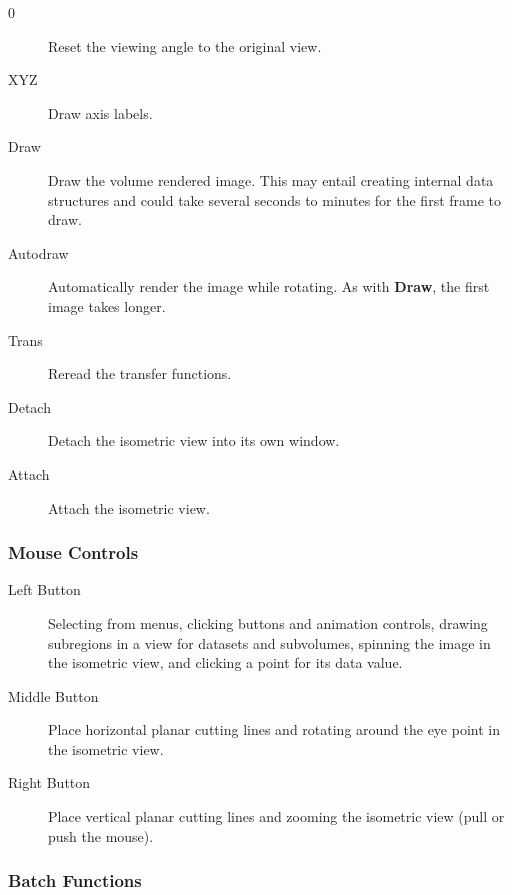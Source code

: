 \begin{description}
\begin{description}
    \item [0]              Reset the viewing angle to the original view.
    \item [XYZ]            Draw axis labels.
    \item [Draw]           Draw the volume rendered image.  This may entail
		           creating internal data structures and could take
		           several seconds to minutes for the first frame
			   to draw.
    \item [Autodraw]       Automatically render the image while rotating.
			   As with {\bf Draw}, the first image takes longer.
    \item [Trans]          Reread the transfer functions.
    \item [Detach]         Detach the isometric view into its own window.
    \item [Attach]         Attach the isometric view.
\end{description}

\end{description}


\subsubsection{Mouse Controls}

\begin{description}
\item [Left Button]  Selecting from menus, clicking buttons and animation controls,
drawing subregions in a view for datasets and subvolumes, spinning the image
in the isometric view, and clicking a point for its data value.

\item [Middle Button]  Place horizontal planar cutting lines and rotating
around the eye point in the isometric view.

\item [Right Button]   Place vertical planar cutting lines and
zooming the isometric view (pull or push the mouse).

\end{description}


\subsubsection{Batch Functions}

